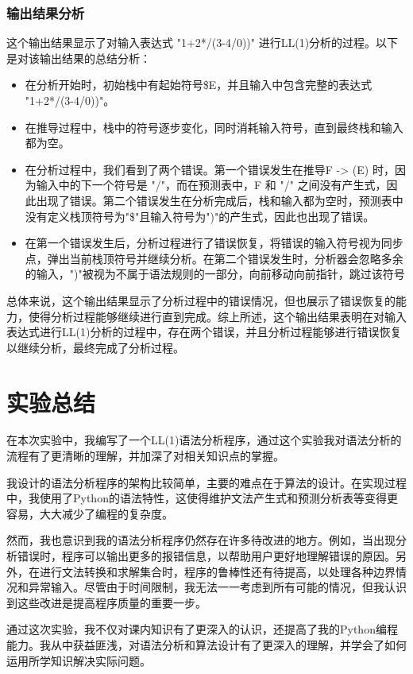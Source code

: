 \documentclass[lang=cn,11pt,a4paper]{elegantpaper}
\begin{document}
\subsubsection{输出结果分析}

这个输出结果显示了对输入表达式 "1+2*/(3-4/0))" 进行LL(1)分析的过程。以下是对该输出结果的总结分析：
\begin{itemize}
    \item 在分析开始时，初始栈中有起始符号\$E，并且输入中包含完整的表达式 "1+2*/(3-4/0))"。
    \item 在推导过程中，栈中的符号逐步变化，同时消耗输入符号，直到最终栈和输入都为空。
    \item 在分析过程中，我们看到了两个错误。第一个错误发生在推导F -> (E) 时，因为输入中的下一个符号是 "/"，而在预测表中，F 和 "/" 之间没有产生式，因此出现了错误。第二个错误发生在分析完成后，栈和输入都为空时，预测表中没有定义栈顶符号为"\$"且输入符号为")"的产生式，因此也出现了错误。
    \item 在第一个错误发生后，分析过程进行了错误恢复，将错误的输入符号视为同步点，弹出当前栈顶符号并继续分析。在第二个错误发生时，分析器会忽略多余的输入，")"被视为不属于语法规则的一部分，向前移动向前指针，跳过该符号
\end{itemize}


总体来说，这个输出结果显示了分析过程中的错误情况，但也展示了错误恢复的能力，使得分析过程能够继续进行直到完成。综上所述，这个输出结果表明在对输入表达式进行LL(1)分析的过程中，存在两个错误，并且分析过程能够进行错误恢复以继续分析，最终完成了分析过程。

\section{实验总结}

在本次实验中，我编写了一个LL(1)语法分析程序，通过这个实验我对语法分析的流程有了更清晰的理解，并加深了对相关知识点的掌握。

我设计的语法分析程序的架构比较简单，主要的难点在于算法的设计。在实现过程中，我使用了Python的语法特性，这使得维护文法产生式和预测分析表等变得更容易，大大减少了编程的复杂度。

然而，我也意识到我的语法分析程序仍然存在许多待改进的地方。例如，当出现分析错误时，程序可以输出更多的报错信息，以帮助用户更好地理解错误的原因。另外，在进行文法转换和求解集合时，程序的鲁棒性还有待提高，以处理各种边界情况和异常输入。尽管由于时间限制，我无法一一考虑到所有可能的情况，但我认识到这些改进是提高程序质量的重要一步。

通过这次实验，我不仅对课内知识有了更深入的认识，还提高了我的Python编程能力。我从中获益匪浅，对语法分析和算法设计有了更深入的理解，并学会了如何运用所学知识解决实际问题。
\end{document}
